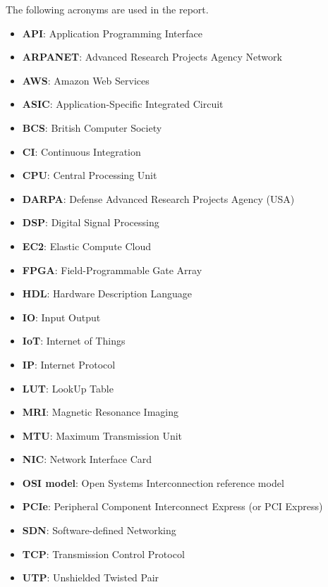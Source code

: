 The following acronyms are used in the report.
\begin{itemize}
  \item \textbf{API}: Application Programming Interface
  \item \textbf{ARPANET}: Advanced Research Projects Agency Network
  \item \textbf{AWS}: Amazon Web Services
  \item \textbf{ASIC}: Application-Specific Integrated Circuit
  \item \textbf{BCS}: British Computer Society
  \item \textbf{CI}: Continuous Integration
  \item \textbf{CPU}: Central Processing Unit
  \item \textbf{DARPA}: Defense Advanced Research Projects Agency (USA)
  \item \textbf{DSP}: Digital Signal Processing
  \item \textbf{EC2}: Elastic Compute Cloud
  \item \textbf{FPGA}: Field-Programmable Gate Array
  \item \textbf{HDL}: Hardware Description Language
  \item \textbf{IO}: Input Output
  \item \textbf{IoT}: Internet of Things
  \item \textbf{IP}: Internet Protocol
  \item \textbf{LUT}: LookUp Table
  \item \textbf{MRI}: Magnetic Resonance Imaging
  \item \textbf{MTU}: Maximum Transmission Unit
  \item \textbf{NIC}: Network Interface Card
  \item \textbf{OSI model}: Open Systems Interconnection reference model
  \item \textbf{PCIe}: Peripheral Component Interconnect Express (or PCI Express)
  \item \textbf{SDN}: Software-defined Networking
  \item \textbf{TCP}: Transmission Control Protocol
  \item \textbf{UTP}: Unshielded Twisted Pair
\end{itemize}
